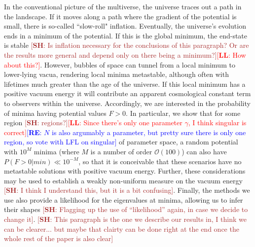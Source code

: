 \documentclass[12pt]{article}
\newcommand{\re}[1]{\textcolor{blue}{[{\bf RE}: #1]}}
\newcommand{\lfl}[1]{\textcolor{red}{[{\bf LL}: #1]}}
\newcommand{\SH}[1]{\textcolor{brown}{[{\bf SH}: #1]}}
\begin{document}

In the conventional picture of the multiverse, the universe traces out a path in the landscape. If it moves along a path where the gradient of the potential is small, there is so-called ``slow-roll" inflation. Eventually, the universe's evolution ends in a minimum of the potential. If this is the global minimum, the end-state is stable \SH{Is inflation necessary for the conclusions of this paragraph? Or are the results more general and depend only on there being a minimum?}\lfl{How about this?}. However, bubbles of space can tunnel from a local minimum to lower-lying vacua, rendering local minima metastable, although often with lifetimes much greater than the age of the universe. If this local minimum has a positive vacuum energy it will contribute an apparent cosmological constant term to observers within the universe. Accordingly, we are interested in the probability of minima having potential values $F > 0$. In particular, we show that for some region \SH{regions?}\lfl{Since there's only one parameter $\gamma$, I think singular is correct}\re{$N$ is also argumably a parameter, but pretty sure there is only one region, so vote with LFL on singular} of parameter space, a random potential with $10^M$ minima (where $M$ is a number of order $\mathcal{O}(100)$) can also have $P(F > 0|min) \ll 10^{-M}$, so that it is conceivable that these scenarios have no metastable solutions with  positive vacuum energy. Further, these considerations may be used to establish a weakly non-uniform measure on the vacuum energy  \SH{I think I understand this, but it is a bit confusing}. Finally, the methods we use also provide a likelihood for the eigenvalues at minima, allowing us to infer their shapes \SH{Flagging up the use of ``likelihood'' again, in case we decide to change it}. \SH{This paragraph is the one we describe our results in, I think we can be clearer... but maybe that clairty can be done right at the end once the whole rest of the paper is also clear}
\end{document}
